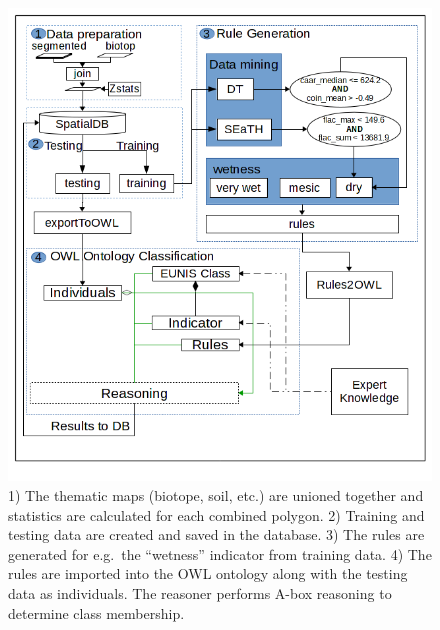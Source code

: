\documentclass[authoryear,preprint,12pt,number]{elsarticle}
\begin{document}
\begin{figure}
\includegraphics[width=1\linewidth]{diagrams/final_workflow_diagram.png}
\caption
    {
        1) The thematic maps (biotope, soil, etc.) are unioned together and
        statistics are calculated for each combined polygon.
        2) Training and testing data are created and saved in the database.
        3) The rules are generated for e.g.\ the ``wetness'' indicator from
        training data.
        4) The rules are imported into the OWL ontology along with the testing
        data as individuals. The reasoner performs A-box reasoning to determine
        class membership.
    } 
\label{fig:full_workflow}
\end{figure}
\label{subsec:reference_data_and_semantic_characterisation} 
\end{document}
